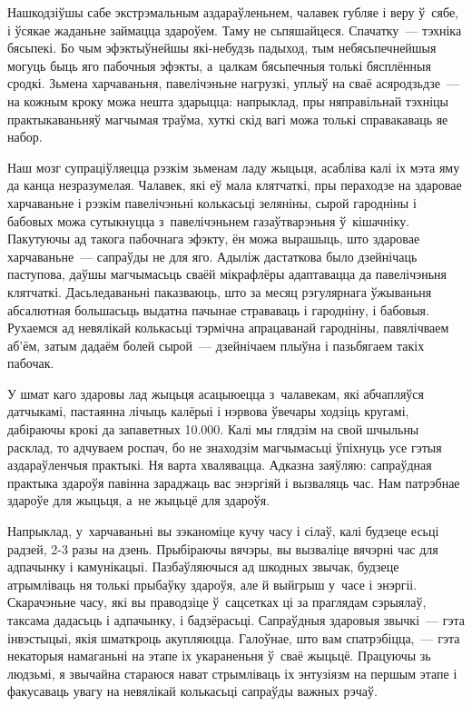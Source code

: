 Нашкодзіўшы сабе экстрэмальным аздараўленьнем, чалавек губляе і веру ў~сябе, і ўсякае жаданьне займацца здароўем. Таму не сьпяшайцеся. Спачатку~--- тэхніка бясьпекі. Бо чым эфэктыўнейшы які-небудзь падыход, тым небясьпечнейшыя могуць быць яго пабочныя эфэкты, а~цалкам бясьпечныя толькі бясплённыя сродкі. Зьмена харчаваньня, павелічэньне нагрузкі, уплыў на сваё асяродзьдзе~--- на кожным кроку можа нешта здарыцца: напрыклад, пры няправільнай тэхніцы практыкаваньняў магчымая траўма, хуткі скід вагі можа толькі справакаваць яе набор.

Наш мозг супраціўляецца рэзкім зьменам ладу жыцьця, асабліва калі іх мэта яму да канца незразумелая. Чалавек, які еў мала клятчаткі, пры пераходзе на здаровае харчаваньне і рэзкім павелічэньні колькасьці зеляніны, сырой гародніны і бабовых можа сутыкнуцца з~павелічэньнем газаўтварэньня ў~кішачніку. Пакутуючы ад такога пабочнага эфэкту, ён можа вырашыць, што здаровае харчаваньне~--- сапраўды не для яго. Адыліж дастаткова было дзейнічаць паступова, даўшы магчымасьць сваёй мікрафлёры адаптавацца да павелічэньня клятчаткі. Дасьледаваньні паказваюць, што за месяц рэгулярнага ўжываньня абсалютная большасьць выдатна пачынае страваваць і гародніну, і бабовыя. Рухаемся ад невялікай колькасьці тэрмічна апрацаванай гародніны, павялічваем аб'ём, затым дадаём болей сырой~--- дзейнічаем плыўна і пазьбягаем такіх пабочак.

У шмат каго здаровы лад жыцьця асацыюецца з~чалавекам, які абчапляўся датчыкамі, пастаянна лічыць калёрыі і нэрвова ўвечары ходзіць кругамі, дабіраючы крокі да запаветных 10.000. Калі мы глядзім на свой шчыльны расклад, то адчуваем роспач, бо не знаходзім магчымасьці ўпіхнуць усе гэтыя аздараўленчыя практыкі. Ня варта хвалявацца. Адказна заяўляю: сапраўдная практыка здароўя павінна зараджаць вас энэргіяй і вызваляць час. Нам патрэбнае здароўе для жыцьця, а~не жыцьцё для здароўя.

Напрыклад, у~харчаваньні вы зэканоміце кучу часу і сілаў, калі будзеце есьці радзей, 2-3 разы на дзень. Прыбіраючы вячэры, вы вызваліце вячэрні час для адпачынку і камунікацыі. Пазбаўляючыся ад шкодных звычак, будзеце атрымліваць ня толькі прыбаўку здароўя, але й выйгрыш у~часе і энэргіі. Скарачэньне часу, які вы праводзіце ў~сацсетках ці за праглядам сэрыялаў, таксама дадасьць і адпачынку, і бадзёрасьці. Сапраўдныя здаровыя звычкі~--- гэта інвэстыцыі, якія шматкроць акупляюцца. Галоўнае, што вам спатрэбіцца,~--- гэта некаторыя намаганьні на этапе іх укараненьня ў~сваё жыцьцё. Працуючы зь людзьмі, я звычайна стараюся нават стрымліваць іх энтузіязм на першым этапе і факусаваць увагу на невялікай колькасьці сапраўды важных рэчаў.


